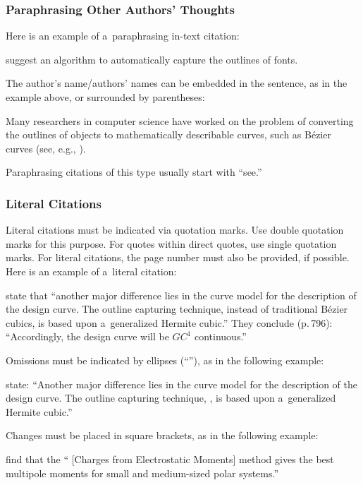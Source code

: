 \documentclass[12pt, a4paper, oneside]{article}
\renewcommand{\caps}[1]{{\textscale{0.97}{\textls[50]{\MakeUppercase{#1}}}}}
\theoremstyle{Plain}
\theoremstyle{Definition}
\theoremstyle{Remark}
\let \citeOrig \cite
\let \cite \textcite
\let \citealp \citeOrig
\begin{document}
\subsubsection{Paraphrasing Other Authors' Thoughts}

Here is an example of a~paraphrasing in-text citation:
\begin{tcolorbox}
	\cite{sarfraz} suggest an algorithm to automatically capture the outlines of fonts.
\end{tcolorbox}

The author's name/authors' names can be embedded in the sentence, as in the example above, or surrounded by parentheses:
\begin{tcolorbox}
	Many researchers in computer science have worked on the problem of converting the outlines of objects to mathematically describable curves, such as B\'{e}zier curves (see, e.g., \citealp{sarfraz}).
\end{tcolorbox}
Paraphrasing citations of this type usually start with ``see.''

\subsubsection{Literal Citations}

Literal citations must be indicated via quotation marks. Use double quotation marks for this purpose. For quotes within direct quotes, use single quotation marks. For literal citations, the page number must also be provided, if possible. Here is an example of a~literal citation:
\begin{tcolorbox}
	\cite[795]{sarfraz} state that ``another major difference lies in the curve model for the description of the design curve. The outline capturing technique, instead of traditional B\'{e}zier cubics, is based upon a~generalized Hermite cubic.'' They conclude (p.\,796): ``Accordingly, the design curve will be $GC^1$ continuous.''
\end{tcolorbox}

Omissions must be indicated by ellipses (``\textellipsis\!''), as in the following example:
\begin{tcolorbox}
	\cite[795]{sarfraz} state: ``Another major difference lies in the curve model for the description of the design curve. The outline capturing technique, \textellipsis, is based upon a~generalized Hermite cubic.''
\end{tcolorbox}

\pagebreak
Changes must be placed in square brackets, as in the following example:
\begin{tcolorbox}
	\cite[377]{sigfridsson} find that the ``\caps{CHELMO} [Charges from Electrostatic Moments] method gives the best multipole moments for small and medium-sized polar systems.''
\end{tcolorbox}
\end{document}
